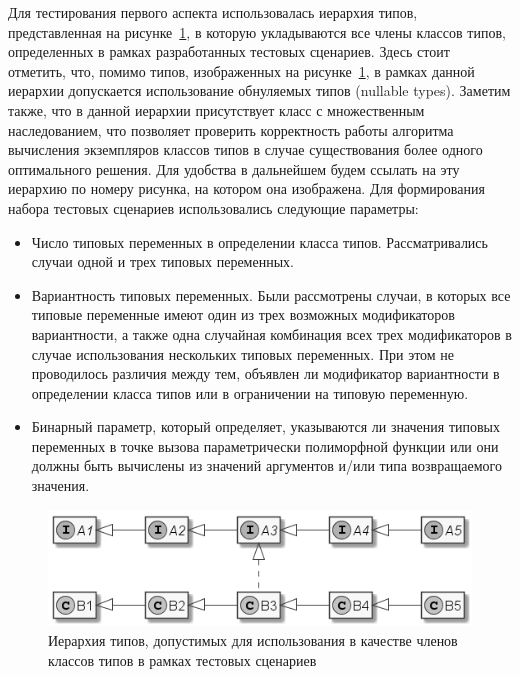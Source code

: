 Для тестирования первого аспекта использовалась иерархия типов, представленная на рисунке~\ref{fig:testing-hierarchy}, в которую укладываются все члены классов типов, определенных в рамках разработанных тестовых сценариев. Здесь стоит отметить, что, помимо типов, изображенных на рисунке~\ref{fig:testing-hierarchy}, в рамках данной иерархии допускается использование обнуляемых типов (nullable types). Заметим также, что в данной иерархии присутствует класс с множественным наследованием, что позволяет проверить корректность работы алгоритма вычисления экземпляров классов типов в случае существования более одного оптимального решения. Для удобства в дальнейшем будем ссылать на эту иерархию по номеру рисунка, на котором она изображена. Для формирования набора тестовых сценариев использовались следующие параметры:
\begin{itemize}
    \item Число типовых переменных в определении класса типов. Рассматривались случаи одной и трех типовых переменных. 
    \item Вариантность типовых переменных. Были рассмотрены случаи, в которых все типовые переменные имеют один из трех возможных модификаторов вариантности, а также одна случайная комбинация всех трех модификаторов в случае использования нескольких типовых переменных. При этом не проводилось различия между тем, объявлен ли модификатор вариантности в определении класса типов или в ограничении на типовую переменную.    
    \item Бинарный параметр, который определяет, указываются ли значения типовых переменных в точке вызова параметрически полиморфной функции или они должны быть вычислены из значений аргументов и/или типа возвращаемого значения.  
\end{itemize}

\begin{figure}[htbp]
    \centering
    \includegraphics[width=\textwidth]{resources/07/02_testing_hierarchy.png}
    \caption{Иерархия типов, допустимых для использования в качестве членов классов типов в рамках тестовых сценариев}
    \label{fig:testing-hierarchy}
\end{figure}

